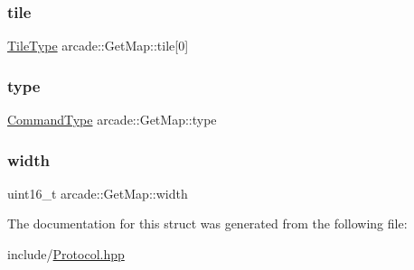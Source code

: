 \mbox{\label{structarcade_1_1_get_map_acc3378cf49857df170f302ed959d0dea}} 
\subsubsection{\texorpdfstring{tile}{tile}}
{\footnotesize\ttfamily \hyperlink{namespacearcade_a61ba576694ea309cdf2b4b66902408ca}{Tile\+Type} arcade\+::\+Get\+Map\+::tile\mbox{[}0\mbox{]}}

\mbox{\label{structarcade_1_1_get_map_a1ea6878b06f00a3d2316dcd974bda8bf}} 
\subsubsection{\texorpdfstring{type}{type}}
{\footnotesize\ttfamily \hyperlink{namespacearcade_a23d58aed7310b22b59e2b8f8ff8a5ffd}{Command\+Type} arcade\+::\+Get\+Map\+::type}

\mbox{\label{structarcade_1_1_get_map_a5d7616bd7955157ccdd663c1e0c9efe3}} 
\subsubsection{\texorpdfstring{width}{width}}
{\footnotesize\ttfamily uint16\+\_\+t arcade\+::\+Get\+Map\+::width}



The documentation for this struct was generated from the following file\+:\begin{DoxyCompactItemize}
\item 
include/\hyperlink{include_2_protocol_8hpp}{Protocol.\+hpp}\end{DoxyCompactItemize}
